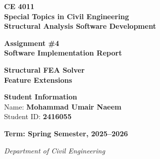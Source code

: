 \documentclass[12pt,a4paper]{article}
\begin{document}

\begin{titlepage}
    \centering
    \vspace*{2cm}
    
    {\Large \textbf{CE 4011}} \\
    {\Large \textbf{Special Topics in Civil Engineering}} \\
    {\Large \textbf{Structural Analysis Software Development}} \\
    \vspace{2cm}
    
    {\huge \textbf{Assignment \#4}} \\
    {\huge \textbf{Software Implementation Report}} \\
    \vspace{3cm}
    
    {\Large \textbf{Structural FEA Solver}} \\
    {\Large \textbf{Feature Extensions}} \\
    \vspace{3cm}
    
    \vfill
    
    {\Large \textbf{Student Information}} \\
    \vspace{1cm}
    {\large Name: \textbf{Mohammad Umair Naeem}} \\
    {\large Student ID: \textbf{2416055}} \\
    \vspace{2cm}
    
    {\Large \textbf{Term: Spring Semester, 2025--2026}} \\
    \vspace{1.5cm}
    
    {\large \textit{Department of Civil Engineering}} \\
    
\end{titlepage}


\newpage
\tableofcontents
\newpage

\end{document}
